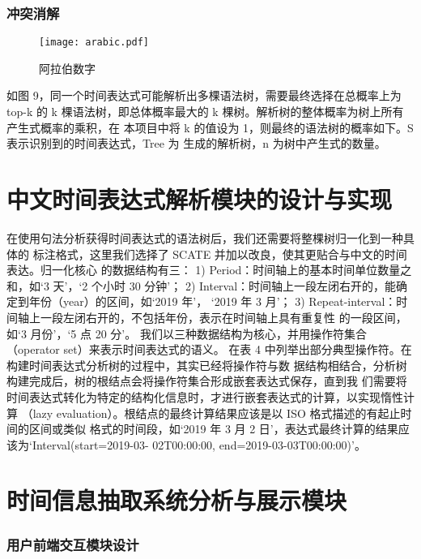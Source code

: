\subsubsection{冲突消解}

\begin{figure}[h]
    \centering
    \texttt{[image: arabic.pdf]}
    \caption{阿拉伯数字}
    \label{fig:arabic}
\end{figure}

如图 9，同一个时间表达式可能解析出多棵语法树，需要最终选择在总概率上为 top-k 的
k 棵语法树，即总体概率最大的 k 棵树。解析树的整体概率为树上所有产生式概率的乘积，在
本项目中将 k 的值设为 1，则最终的语法树的概率如下。S 表示识别到的时间表达式，Tree 为
生成的解析树，n 为树中产生式的数量。


\section{中文时间表达式解析模块的设计与实现}

在使用句法分析获得时间表达式的语法树后，我们还需要将整棵树归一化到一种具体的
标注格式，这里我们选择了 SCATE 并加以改良，使其更贴合与中文的时间表达。归一化核心
的数据结构有三：
1) Period：时间轴上的基本时间单位数量之和，如‘3 天’，‘2 个小时 30 分钟’；
2) Interval：时间轴上一段左闭右开的，能确定到年份（year）的区间，如‘2019 年’，
‘2019 年 3 月’；
3) Repeat-interval：时间轴上一段左闭右开的，不包括年份，表示在时间轴上具有重复性
的一段区间，如‘3 月份’，‘5 点 20 分’。
我们以三种数据结构为核心，并用操作符集合（operator set）来表示时间表达式的语义。
在表 4 中列举出部分典型操作符。在构建时间表达式分析树的过程中，其实已经将操作符与数
据结构相结合，分析树构建完成后，树的根结点会将操作符集合形成嵌套表达式保存，直到我
们需要将时间表达式转化为特定的结构化信息时，才进行嵌套表达式的计算，以实现惰性计算
（lazy evaluation）。根结点的最终计算结果应该是以 ISO 格式描述的有起止时间的区间或类似
格式的时间段，如‘2019 年 3 月 2 日’，表达式最终计算的结果应该为‘Interval(start=2019-03-
02T00:00:00, end=2019-03-03T00:00:00)’。


\section{时间信息抽取系统分析与展示模块}

\subsubsection{用户前端交互模块设计}

